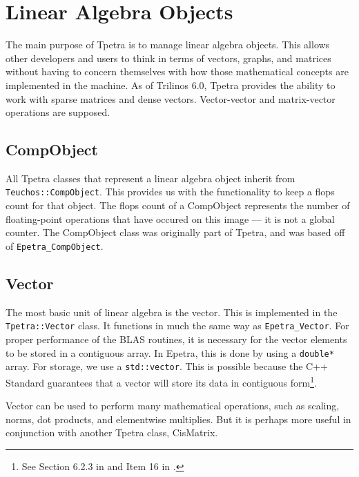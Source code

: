 \documentclass[10pt,relax]{TpetraDesign}
\begin{document}
%
\section{Linear Algebra Objects}

The main purpose of Tpetra is to manage linear algebra objects. This allows other developers and users to think in terms of vectors, graphs, and matrices without having to concern themselves with how those mathematical concepts are implemented in the machine. As of Trilinos 6.0, Tpetra provides the ability to work with sparse matrices and dense vectors. Vector-vector and matrix-vector operations are supposed.

%
\subsection{CompObject}
All Tpetra classes that represent a linear algebra object inherit from \texttt{Teuchos::CompObject}. This provides us with the functionality to keep a flops count for that object. The flops count of a CompObject represents the number of floating-point operations that have occured on this image --- it is not a global counter. The CompObject class was originally part of Tpetra, and was based off of \texttt{Epetra\_CompObject}. 

%
\subsection{Vector}
The most basic unit of linear algebra is the vector. This is implemented in the \texttt{Tpetra::Vector} class. It functions in much the same way as \texttt{Epetra\_Vector}. For proper performance of the BLAS routines, it is necessary for the vector elements to be stored in a contiguous array. In Epetra, this is done by using a \texttt{double*} array. For storage, we use a \texttt{std::vector}. This is possible because the C++ Standard guarantees that a vector will store its data in contiguous form\footnote{See Section 6.2.3 in \cite{Josuttis99} and Item 16 in \cite{Effective-STL}.}.

Vector can be used to perform many mathematical operations, such as scaling, norms, dot products, and elementwise multiplies. But it is perhaps more useful in conjunction with another Tpetra class, CisMatrix.
\end{document}
